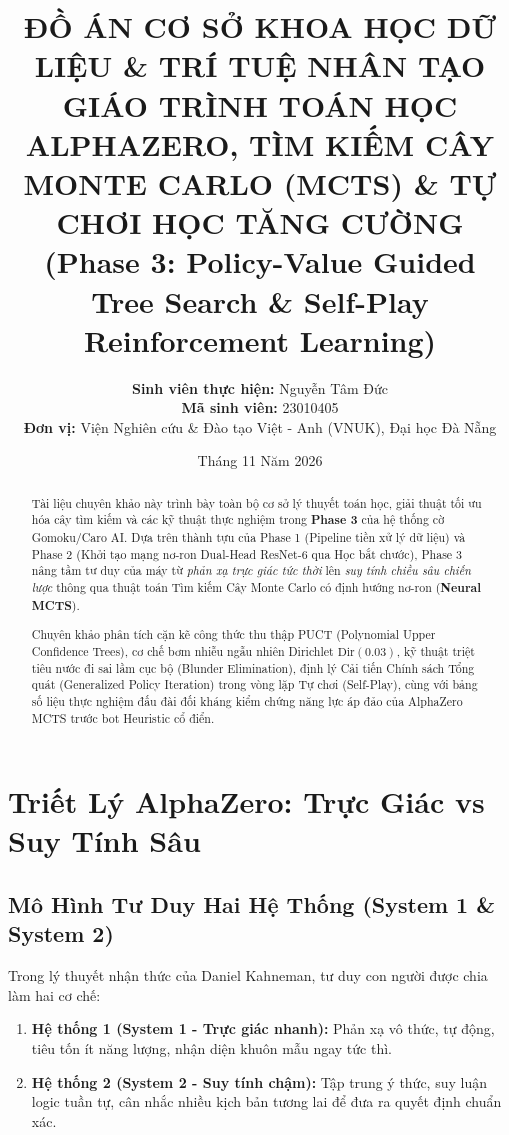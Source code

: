 \documentclass[12pt,a4paper,oneside]{report}
\title{
    \vspace{-1.5cm}
    \textbf{\Large ĐỒ ÁN CƠ SỞ KHOA HỌC DỮ LIỆU \& TRÍ TUỆ NHÂN TẠO}\\
    \vspace{0.8cm}
    \textbf{\Huge GIÁO TRÌNH TOÁN HỌC ALPHAZERO, TÌM KIẾM CÂY MONTE CARLO (MCTS) \& TỰ CHƠI HỌC TĂNG CƯỜNG}\\
    \vspace{0.5cm}
    \textbf{\LARGE (Phase 3: Policy-Value Guided Tree Search \& Self-Play Reinforcement Learning)}
}
\author{
    \textbf{Sinh viên thực hiện:} Nguyễn Tâm Đức\\
    \textbf{Mã sinh viên:} 23010405\\
    \textbf{Đơn vị:} Viện Nghiên cứu \& Đào tạo Việt - Anh (VNUK), Đại học Đà Nẵng
}
\date{Tháng 11 Năm 2026}
\begin{document}
\maketitle

\begin{abstract}
Tài liệu chuyên khảo này trình bày toàn bộ cơ sở lý thuyết toán học, giải thuật tối ưu hóa cây tìm kiếm và các kỹ thuật thực nghiệm trong \textbf{Phase 3} của hệ thống cờ Gomoku/Caro AI. Dựa trên thành tựu của Phase 1 (Pipeline tiền xử lý dữ liệu) và Phase 2 (Khởi tạo mạng nơ-ron Dual-Head ResNet-6 qua Học bắt chước), Phase 3 nâng tầm tư duy của máy từ \textit{phản xạ trực giác tức thời} lên \textit{suy tính chiều sâu chiến lược} thông qua thuật toán Tìm kiếm Cây Monte Carlo có định hướng nơ-ron (\textbf{Neural MCTS}). 

Chuyên khảo phân tích cặn kẽ công thức thu thập PUCT (Polynomial Upper Confidence Trees), cơ chế bơm nhiễu ngẫu nhiên Dirichlet $\text{Dir}(0.03)$, kỹ thuật triệt tiêu nước đi sai lầm cục bộ (Blunder Elimination), định lý Cải tiến Chính sách Tổng quát (Generalized Policy Iteration) trong vòng lặp Tự chơi (Self-Play), cùng với bảng số liệu thực nghiệm đấu đài đối kháng kiểm chứng năng lực áp đảo của AlphaZero MCTS trước bot Heuristic cổ điển.
\end{abstract}

\tableofcontents
\newpage

\chapter{Triết Lý AlphaZero: Trực Giác vs Suy Tính Sâu}

\section{Mô Hình Tư Duy Hai Hệ Thống (System 1 \& System 2)}

Trong lý thuyết nhận thức của Daniel Kahneman, tư duy con người được chia làm hai cơ chế:
\begin{enumerate}
    \item \textbf{Hệ thống 1 (System 1 - Trực giác nhanh):} Phản xạ vô thức, tự động, tiêu tốn ít năng lượng, nhận diện khuôn mẫu ngay tức thì.
    \item \textbf{Hệ thống 2 (System 2 - Suy tính chậm):} Tập trung ý thức, suy luận logic tuần tự, cân nhắc nhiều kịch bản tương lai để đưa ra quyết định chuẩn xác.
\end{enumerate}
\end{document}
